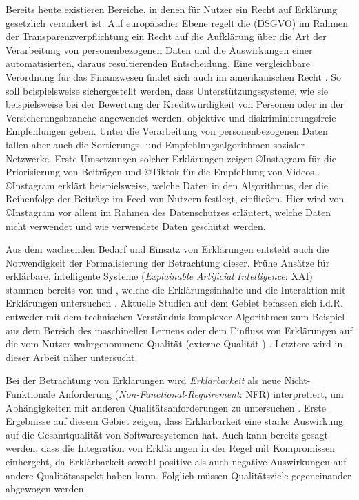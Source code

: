 Bereits heute existieren Bereiche, in denen für Nutzer ein \glqq Recht auf Erklärung\grqq{} gesetzlich verankert ist. Auf europäischer Ebene regelt die  (DSGVO) \cite{eu_verordnung_2016} im Rahmen der Transparenzverpflichtung ein Recht auf die Aufklärung über die Art der Verarbeitung von personenbezogenen Daten und die Auswirkungen einer automatisierten, daraus resultierenden Entscheidung. Eine vergleichbare Verordnung für das Finanzwesen findet sich auch im amerikanischen Recht \cite{cfpb_regulation_2018}. So soll beispielsweise sichergestellt werden, dass Unterstützungssysteme, wie sie beispielsweise bei der Bewertung der Kreditwürdigkeit von Personen oder in der Versicherungsbranche angewendet werden, objektive und diskriminierungsfreie Empfehlungen geben. Unter die Verarbeitung von personenbezogenen Daten fallen aber auch die Sortierungs- und Empfehlungsalgorithmen sozialer Netzwerke. Erste Umsetzungen solcher Erklärungen zeigen \copyright Instagram für die Priorisierung von Beiträgen und \copyright Tiktok für die Empfehlung von Videos \cite{mosseri_shedding_2021,tiktok_technology_limited_how_2021}. \copyright Instagram erklärt beispielsweise, welche Daten in den Algorithmus, der die Reihenfolge der Beiträge im Feed von Nutzern festlegt, einfließen. Hier wird von \copyright Instagram vor allem im Rahmen des Datenschutzes erläutert, welche Daten nicht verwendet und wie verwendete Daten geschützt werden.

Aus dem wachsenden Bedarf und Einsatz von Erklärungen entsteht auch die Notwendigkeit der Formalisierung der Betrachtung dieser. Frühe Ansätze für erklärbare, intelligente Systeme (\textit{Explainable Artificial Intelligence}: XAI) stammen bereits von \citeauthor{byrne1991construction} und \citeauthor{cawsey1991generating}, welche die Erklärungsinhalte \cite{byrne1991construction} und die Interaktion mit Erklärungen untersuchen \cite{cawsey1991generating}. Aktuelle Studien auf dem Gebiet befassen sich i.d.R. entweder mit dem technischen Verständnis komplexer Algorithmen zum Beispiel aus dem Bereich des maschinellen Lernens \cite{gilpin_explaining_2018, fong_interpretable_2017, samek_towards_2019} oder dem Einfluss von Erklärungen auf die vom Nutzer wahrgenommene Qualität (externe Qualität \cite{international2011iso}) \cite{nunes_systematic_2017,kouki_user_2017,chazette_end-users_nodate}. Letztere wird in dieser Arbeit näher untersucht.

Bei der Betrachtung von Erklärungen wird \textit{Erklärbarkeit} als neue Nicht-Funktionale Anforderung (\textit{Non-Functional-Requirement}: NFR) interpretiert, um Abhängigkeiten mit anderen Qualitätsanforderungen zu untersuchen \cite{kohl_explainability_2019, chazette2020explainability}. Erste Ergebnisse auf diesem Gebiet zeigen, dass Erklärbarkeit eine starke Auswirkung auf die Gesamtqualität von Softwaresystemen hat. Auch kann bereits gesagt werden, dass die Integration von Erklärungen in der Regel mit Kompromissen einhergeht, da Erklärbarkeit sowohl positive als auch negative Auswirkungen auf andere Qualitätsaspekt haben kann. Folglich müssen Qualitätsziele gegeneinander abgewogen werden.

